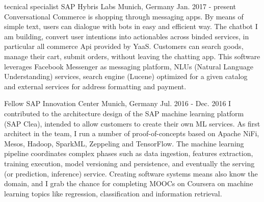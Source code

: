 

\begin{cventries}

  \cventry
    {tecnical specialist} %
    {SAP Hybris Labs} %
    {Munich, Germany} %
    {Jan. 2017 - present} %
    {
      Conversational Commerce is shopping through messaging apps. By means of simple text, users can dialogue with bots in easy and efficient way.
      The chatbot I am building, convert user intentions into actionables across binded services, in particular all commerce Api provided by YaaS.
      Customers can search goods, manage their cart, submit orders, without leaving the chatting app.
      This software leverages Facebook Messenger as messaging platform, NLUs (Natural Language Understanding) services, search engine (Lucene)
      optimized for a given catalog and external services for address formatting and payment.
    }

  \cventry
    {Fellow} %
    {SAP Innovation Center} %
    {Munich, Germany} %
    {Jul. 2016 - Dec. 2016} %
    {
      I contributed to the architecture design of the SAP machine learning platform (SAP Clea), intended to allow customers to create their own ML services.
      As first architect in the team, I run a number of proof-of-concepts based on Apache NiFi, Mesos, Hadoop, SparkML,
      Zeppeling and TensorFlow. The machine learning pipeline coordinates complex phases such as data ingestion, features extraction, training execution,
      model versioning and persistence, and eventually the serving (or prediction, inference) service. Creating software systems means also know the domain,
      and I grab the chance for completing MOOCs on Coursera on machine learning topics like regression, classification and information retrieval.
    }


\end{cventries}
